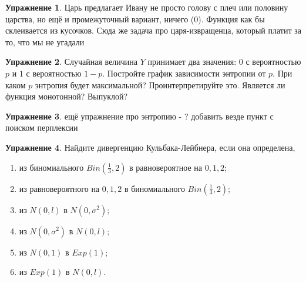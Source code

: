 \documentclass[12pt, a4paper, oneside]{extreport}
\theoremstyle{plain}              %
\theoremstyle{definition}         %
\newtheorem{problem}{\color{myblue} Упражнение}
\begin{document}

\begin{problem}
	Царь предлагает Ивану не просто голову с плеч или половину царства, но ещё и промежуточный вариант, ничего (0). Функция как бы склеивается из кусочков. Сюда же задача про царя-извращенца, который платит за то, что мы не угадали
	\begin{sol} 
		
		
	\end{sol} 
\end{problem}


\begin{problem}
Случайная величина $Y$ принимает два значения: $0$ с вероятностью $p$ и $1$ с вероятностью $1-p$. Постройте график зависимости энтропии от $p$. При каком $p$ энтропия будет максимальной? Проинтерпретируйте это. Является ли функция монотонной? Выпуклой? 	
\begin{sol} 
	
\end{sol} 
\end{problem}


\begin{problem}
	ещё упражнение про энтропию - ?  
	добавить везде пункт с поиском перплексии 
	\begin{sol} 
		
	\end{sol} 
\end{problem}

  
 \begin{problem}
Найдите дивергенцию Кульбака-Лейбнера, если она определена, 

\begin{enumerate}
\item  из биномиального $Bin(\frac{1}{3}, 2)$ в равновероятное на $0,1,2$;
\item из равновероятного на $0,1,2$ в биномиального $Bin(\frac{1}{3}, 2)$;
\item из $N(0,l)$ в $N(0, \sigma^2)$;
\item из  $N(0, \sigma^2)$ в $N(0,l)$;
\item из $N(0,1)$ в $Exp(1)$;
\item из $Exp(1)$ в $N(0,l)$. 
\end{enumerate}

	\begin{sol} 
		
	\end{sol} 
\end{problem}
\end{document}
